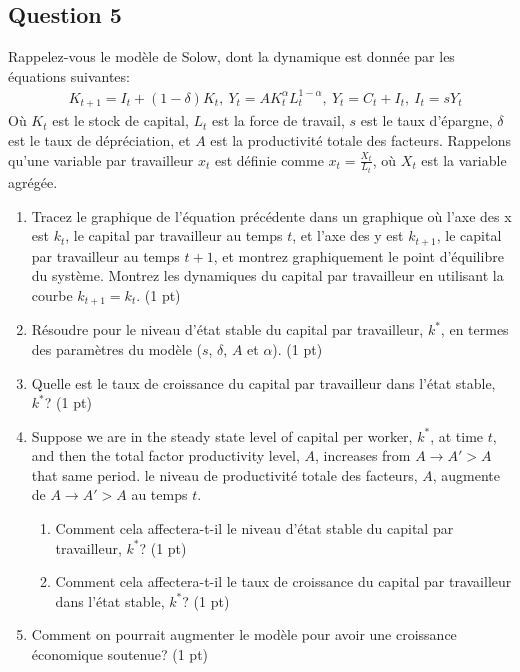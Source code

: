 \documentclass[11pt]{article}
\begin{document}
\subsection*{Question 5}
Rappelez-vous le modèle de Solow, dont la dynamique est donnée par les équations suivantes:
\begin{align}
    &K_{t+1} =I_t + (1-\delta)K_t,
    \ 
    Y_t = A K_t^{\alpha} L_t^{1-\alpha},
    \ Y_t = C_t + I_t,
    \ I_t = sY_t
\end{align}
Où \(K_t\) est le stock de capital, \(L_t\) est la force de travail, \(s\) est le taux d'épargne, \(\delta\) est le taux de dépréciation, et \(A\) 
est la productivité totale des facteurs. Rappelons qu'une variable par travailleur \(x_t\) est définie comme \(x_t = \frac{X_t}{L_t}\), 
où \(X_t\) est la variable agrégée.

\begin{enumerate}
    \item Tracez le graphique de l'équation précédente dans un graphique où l'axe des x est \(k_t\),
    le capital par travailleur au temps \(t\), et l'axe des y est \(k_{t+1}\),
    le capital par travailleur au temps \(t+1\), et montrez graphiquement le point d'équilibre du système.
    Montrez les dynamiques du capital par travailleur en utilisant la courbe \(k_{t+1} = k_t\).
    (1 pt)
    \item Résoudre pour le niveau d'état stable du capital par travailleur, \(k^*\), en termes des paramètres du modèle
    (\(s\), \(\delta\), \(A\) et \(\alpha\)). (1 pt)
    \item Quelle est le taux de croissance du capital par travailleur dans l'état stable, \(k^*\)? (1 pt)
    \item Suppose we are in the steady state level of capital per worker, \(k^*\), at
    time \(t\), and then the total factor productivity level, \(A\), increases from
    \(A \to A'>A\) that same period.  
    le niveau de productivité totale des facteurs, \(A\), augmente de 
    \(A \to A'>A\) au temps \(t\). 
    \begin{enumerate}
        \item Comment cela affectera-t-il le niveau d'état stable du capital par travailleur, \(k^*\)? (1 pt)
        \item Comment cela affectera-t-il le taux de croissance du capital par travailleur dans l'état stable, \(k^*\)? (1 pt)
    \end{enumerate}
    \item Comment on pourrait augmenter le modèle pour avoir une croissance économique soutenue? (1 pt)
\end{enumerate}
\end{document}
